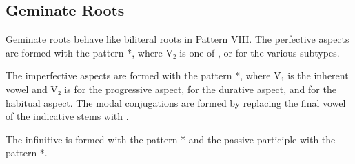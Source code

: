\documentclass[grammar]{subfiles}
\begin{document}
\subsection{Geminate Roots}
\label{ssec:vm_viii_geminate_roots}

Geminate roots behave like biliteral roots in Pattern VIII.  The perfective
aspects are formed with the pattern *, where V₂ is one of ,
 or  for the various subtypes.  

The imperfective aspects are formed with the pattern *, where
V₁ is the inherent vowel and V₂ is  for the progressive aspect, 
for the durative aspect, and  for the habitual aspect.  The modal
conjugations are formed by replacing the final vowel of the indicative stems
with . 

The infinitive is formed with the pattern * and the passive
participle with the pattern *.  

\begin{table}[h!]\small\capstart
  \centering
  \\
  \caption{Pattern VIII geminate stems \label{tab:vm_viii_geminate_stems}}
\end{table}
\end{document}
